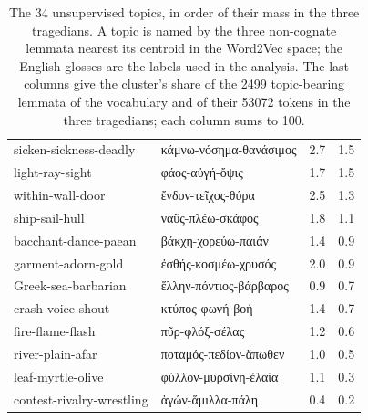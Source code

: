 \begin{table}[htbp]
\begin{tabular*}{\textwidth}{@{\extracolsep{\fill}}llrr}
sicken-sickness-deadly & κάμνω-νόσημα-θανάσιμος & 2.7 & 1.5 \\
light-ray-sight & φάος-αὐγή-ὄψις & 1.7 & 1.5 \\
within-wall-door & ἔνδον-τεῖχος-θύρα & 2.5 & 1.3 \\
ship-sail-hull & ναῦς-πλέω-σκάφος & 1.8 & 1.1 \\
bacchant-dance-paean & βάκχη-χορεύω-παιάν & 1.4 & 0.9 \\
garment-adorn-gold & ἐσθής-κοσμέω-χρυσός & 2.0 & 0.9 \\
Greek-sea-barbarian & ἕλλην-πόντιος-βάρβαρος & 0.9 & 0.7 \\
crash-voice-shout & κτύπος-φωνή-βοή & 1.4 & 0.7 \\
fire-flame-flash & πῦρ-φλόξ-σέλας & 1.2 & 0.6 \\
river-plain-afar & ποταμός-πεδίον-ἄπωθεν & 1.0 & 0.5 \\
leaf-myrtle-olive & φύλλον-μυρσίνη-ἐλαία & 1.1 & 0.3 \\
contest-rivalry-wrestling & ἀγών-ἅμιλλα-πάλη & 0.4 & 0.2 \\
\bottomrule
\end{tabular*}
\caption{The 34 unsupervised topics, in order of their mass in the three tragedians. A topic is named by the three
non-cognate lemmata nearest its centroid in the Word2Vec space; the English glosses are the labels used in the
analysis. The last columns give the cluster's share of the 2499 topic-bearing lemmata of the vocabulary and of their 53072
tokens in the three tragedians; each column sums to 100.}
\label{tab:topics}
\end{table}
